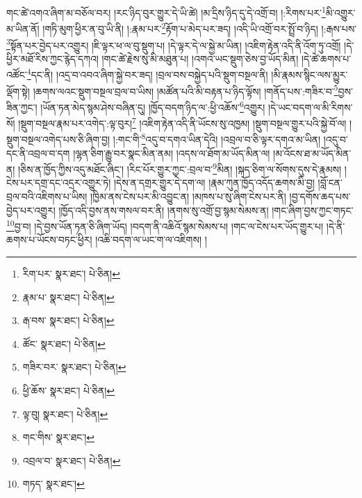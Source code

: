 གང་ཚེ་འགའ་ཞིག་མ་བཅོལ་བར། །རང་ཉིད་བུར་གྱུར་དེ་ཡི་ཚེ། །མ་དྲིས་ཉིད་དུ་དེ་འགྲོ་བ། །:རིགས་པར་\footnote{རིག་པར་  སྣར་ཐང་།  པེ་ཅིན། }མི་འགྱུར་མ་ཡིན་ནོ། །གཏི་མུག་ཕྱིར་ན་བུ་ཡི་ནི། །:རྣམ་པར་\footnote{རྣམ་པ་  སྣར་ཐང་།  པེ་ཅིན། }རྟོག་པ་མེད་པར་ཟད། །འདི་ཡི་འགྲོ་བར་སྤྲོ་བ་ཉིད། །:རྒས་པས་\footnote{རྒ་བས་  སྣར་ཐང་།  པེ་ཅིན། }སྟོན་པར་བྱེད་པར་འགྱུར། །ཇི་ལྟར་ཕ་ལ་བུ་སྡུག་པ། །དེ་ལྟར་དེ་ལ་སྐྱེ་མ་ཡིན། །འཇིག་རྟེན་འདི་ནི་འོག་ཏུ་འགྲོ། །དེ་ཕྱིར་མཐོ་རིས་ཀྱང་རྙེད་དཀའ། །གང་ཚེ་རྗེས་སུ་མི་མཐུན་པ། །འགའ་ཡང་སྡུག་ཅེས་བྱ་ཡོད་མིན། །དེ་ཚེ་ཆགས་པ་འཚོང་\footnote{ཚོང་  སྣར་ཐང་།  པེ་ཅིན། }དང་ནི། །འདྲ་བ་འབའ་ཞིག་སྐྱེ་བར་ཟད། །བྲལ་བས་བསྐྱེད་པའི་སྡུག་བསྔལ་ནི། །མི་རྣམས་སྙིང་ལས་མྱུར་ལྡོག་སྟེ། །ཆགས་ལའང་སྡུག་བསྔལ་བྲལ་བ་ཡིས། །མཚོན་པའི་མི་བརྟན་པ་ཉིད་ལྟོས། །གནོད་པས་:གཟིར་བ་\footnote{གཟིར་བར་  སྣར་ཐང་།  པེ་ཅིན། }བྱས་ཟིན་ཀྱང་། །ཡོན་ཏན་མེད་སྙམ་ཤེས་བཞིན་དུ། །ཁྱོད་བདག་ཉིད་ལ་:ཕྱི་འཆོས་\footnote{ཕྱི་ཆོས་  སྣར་ཐང་།  པེ་ཅིན། }འགྱུར། །དེ་ཡང་བདག་ལ་མི་རིགས་སོ། །སྡུག་བསྔལ་རྣམ་པར་འགེད་:ལྟ་བུར།\footnote{ལྟ་བུ།  སྣར་ཐང་།  པེ་ཅིན། } །འཇིག་རྟེན་འདི་ནི་ཡོངས་སུ་འཁྱམ། །སྡུག་བསྔལ་གྱུར་པའི་སྐྱེ་བོ་ལ། །སྡུག་བསྔལ་འགེད་པས་ཅི་ཞིག་བྱ། །:གང་གི་\footnote{གང་གིས་  སྣར་ཐང་། }འདུ་བ་དགའ་ཡིན་དེའི། །འབྲལ་བ་ཅི་ལྟར་དགའ་མ་ཡིན། །འདུ་བ་དང་ནི་འབྲལ་བ་དག །ལྷན་ཅིག་རྒྱུ་བར་སྣང་མིན་ནམ། །འདས་ལ་ཐོག་མ་ཡོད་མིན་ལ། །མ་འོངས་ཐ་མ་ཡོད་མིན་ན། །ཅིས་ན་ཁྱོད་ཀྱིས་འདུ་མཐོང་ཞིང་། །རིང་པོར་གྱུར་ཀྱང་:བྲལ་བ་\footnote{འབྲལ་བ་  སྣར་ཐང་།  པེ་ཅིན། }མིན། །སྐད་ཅིག་ལ་སོགས་དུས་དེ་རྣམས། །ངེས་པར་དགྲ་དང་འདྲར་འགྱུར་ཏེ། །དེས་ན་དགྲར་གྱུར་དེ་དག་ལ། །རྣམ་ཀུན་ཁྱོད་འདོད་ཆགས་མི་བྱ། །བློ་ངན་བྲལ་བའི་འཇིགས་པ་ཡིས། །ཁྱིམ་ནས་ངེས་པར་མི་འབྱུང་ན། །མཁས་པ་སུ་ཞིག་ངེས་པར་ནི། །བྱ་དགོས་ཆད་པས་བྱེད་པར་འགྱུར། །ཁྱོད་འདི་བྱས་ནས་གསལ་བར་ནི། །ནགས་སུ་འགྲོ་བྱ་སྙམ་སེམས་ན། །གང་ཞིག་བྱས་ཀྱང་གཏང་\footnote{གཏད་  སྣར་ཐང་། }བྱ་བ། །དེ་བྱས་ཡོན་ཏན་ཅི་ཞིག་ཡོད། །བདག་ནི་འཆིའོ་སྙམ་སེམས་པ། །གང་ལ་ངེས་པར་ཡོད་གྱུར་པ། །དེ་ནི་ཆགས་པ་ཡོངས་བཏང་ཕྱིར། །འཆི་བདག་ལ་ཡང་ག་ལ་འཇིགས། །
